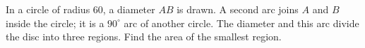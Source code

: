 In a circle of radius $60$, a diameter $AB$ is drawn. A second arc joins $A$ and $B$ inside the circle; it is a $90^\circ$ arc of another circle. The diameter and this arc divide the disc into three regions. Find the area of the smallest region.
